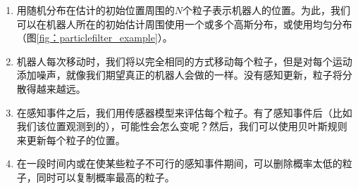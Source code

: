 \begin{enumerate}

\item 用随机分布在估计的初始位置周围的$N$个粒子表示机器人的位置。为此，我们可以在机器人所在的初始估计周围使用一个或多个高斯分布，或使用均匀分布（图\ref{fig：particlefilter_example}）。
\item 机器人每次移动时，我们将以完全相同的方式移动每个粒子，但是对每个运动添加噪声，就像我们期望真正的机器人会做的一样。没有感知更新，粒子将分散得越来越远。
\item 在感知事件之后，我们用传感器模型来评估每个粒子。有了感知事件后（比如我们该位置观测到的），可能性会怎么变呢？然后，我们可以使用贝叶斯规则来更新每个粒子的位置。
\item 在一段时间内或在使某些粒子不可行的感知事件期间，可以删除概率太低的粒子，同时可以复制概率最高的粒子。
\end{enumerate}

